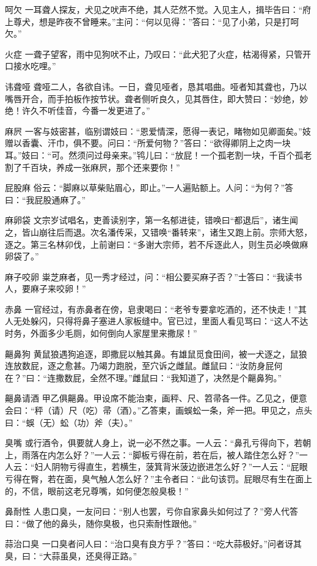 \documentclass[12pt,UTF8]{ctexbook}
\begin{document}
呵欠
一耳聋人探友，犬见之吠声不绝，其人茫然不觉。入见主人，揖毕告曰：“府上尊犬，想是昨夜不曾睡来。”主问：“何以见得：”答曰：“见了小弟，只是打呵欠。”

火症
一聋子望客，雨中见狗吠不止，乃叹曰：“此犬犯了火症，枯渴得紧，只管开口接水吃哩。”

讳聋哑
聋哑二人，各欲自讳。一日，聋见哑者，恳其唱曲。哑者知其聋也，乃以嘴唇开合，而手拍板作按节状。聋者侧听良久，见其唇住，即大赞曰：“妙绝，妙绝！许久不听佳音，今番一发更进了。”

麻屄
一客与妓密甚，临别谓妓曰：“恩爱情深，愿得一表记，睹物如见卿面矣。”妓赠以香囊、汗巾，俱不要。问曰：“所爱何物？”答曰：“欲得卿阴上之肉一块耳。”妓曰：“可。然须问过母亲来。”鸨儿曰：“放屁！一个孤老割一块，千百个孤老割了千百块，养成一张麻屄，那个还来要你！”

屁股麻
俗云：“脚麻以草柴贴眉心，即止。”一人遍贴额上。人问：“为何？”答曰：“我屁股通麻了。”

麻卵袋
文宗岁试唱名，吏善读别字，第一名郁进徒，错唤曰“都退后”，诸生闻之，皆山崩往后而退。次名潘传采，又错唤“番转来”，诸生又跑上前。宗师大怒，逐之。第三名林卯伐，上前谢曰：“多谢大宗师，若不斥逐此人，则生员必唤做麻卵袋了。”

麻子咬卵
粜芝麻者，见一秀才经过，问：“相公要买麻子否？”士答曰：“我读书人，要麻子来咬卵！”

赤鼻
一官经过，有赤鼻者在傍，皂隶喝曰：“老爷专要拿吃酒的，还不快走！”其人无处躲闪，只得将鼻子塞进人家板缝中。官已过，里面人看见骂曰：“这人不达时务，外面多少毛厕，如何倒向人家屋里来撒尿！”

齆鼻狗
黄鼠狼遇狗追逐，即撒屁以触其鼻。有雄鼠觅食田间，被一犬逐之，鼠狼连放数屁，逐之愈甚。乃竭力跑脱，至穴诉之雌鼠。雌鼠曰：“汝防身屁何在？”曰：“连撒数屁，全然不理。”雌鼠曰：“我知道了，决然是个齆鼻狗。”

齆鼻请酒
甲乙俱齆鼻。甲设席不能治柬，画秤、尺、笤帚各一件。乙见之，便意会曰：“秤（请）尺（吃）帚（酒）。”乙答柬，画蜈蚣一条，斧一把。甲见之，点头曰：“蜈（无）蚣（功）斧（夫）。”

臭嘴
或行酒令，俱要就人身上，说一必不然之事。一人云：“鼻孔亏得向下，若朝上，雨落在内怎么好？”一人云：“脚板亏得在前，若在后，被人踏住怎么好？”一人云：“妇人阴物亏得直生，若横生，菠箕背米菠边嵌进怎么好？”一人云：“屁眼亏得在臀，若在面，臭气触人怎么好？”主令者曰：“此句该罚。屁眼尽有生在面上的，不信，眼前这老兄尊嘴，如何便怎般臭极！”

鼻耐性
人患口臭，一友问曰：“别人也罢，亏你自家鼻头如何过了？”旁人代答曰：“做了他的鼻头，随你臭极，也只索耐性跟他。”

蒜治口臭
一口臭者问人曰：“治口臭有良方乎？”答曰：“吃大蒜极好。”问者讶其臭，曰：“大蒜虽臭，还臭得正路。”
\end{document}
